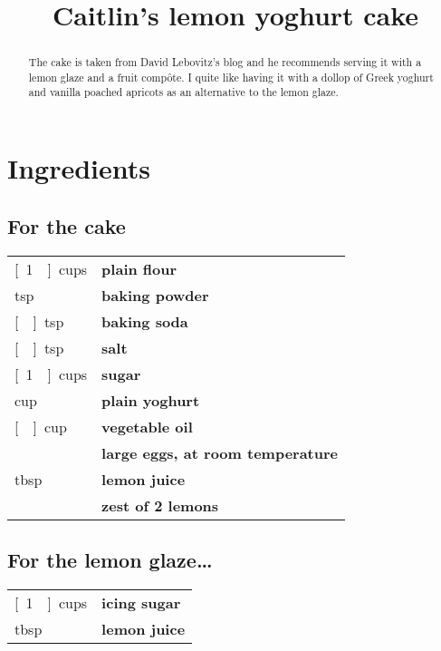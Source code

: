 \documentclass[main.tex]{subfiles}
\title{Caitlin's lemon yoghurt cake}
\begin{document}
\maketitle

\begin{abstract}
The cake is taken from David Lebovitz’s blog and he recommends serving it with a lemon glaze and a fruit comp\^{o}te. I quite like having it with a dollop of Greek yoghurt and vanilla poached apricots as an alternative to the lemon glaze.
\end{abstract}

\section{Ingredients}

\subsection{For the cake}
\vspace*{-\baselineskip}
\begin{table}[ht]
	\begin{tabularx}{\textwidth}{>{\hsize=0.333\hsize}X>{\bf\hsize=1\hsize}X}
	\unit[1\nicefrac{1}{2}]{cups} & plain flour\\
	\unit[1]{tsp} & baking powder\\
	\unit[\nicefrac{1}{2}]{tsp} & baking soda\\
	\unit[\nicefrac{1}{2}]{tsp} & salt\\
	\unit[1\nicefrac{1}{2}]{cups} & sugar\\
	\unit[1]{cup} & plain yoghurt\\
	\unit[\nicefrac{1}{2}]{cup} & vegetable oil \\
	\unit[2]{} & large eggs, at room temperature \\
	\unit[2]{tbsp} & lemon juice\\
	& zest of 2 lemons
	\end{tabularx}
\end{table}

\subsection{For the lemon glaze\dots}
\vspace*{-\baselineskip}
\begin{table}[ht]
	\begin{tabularx}{\textwidth}{>{\hsize=0.333\hsize}X>{\bf\hsize=1\hsize}X}
	\unit[1\nicefrac{1}{2}]{cups} & icing sugar\\
	\unit[3]{tbsp} & lemon juice\\
	\end{tabularx}
\end{table}
\end{document}
